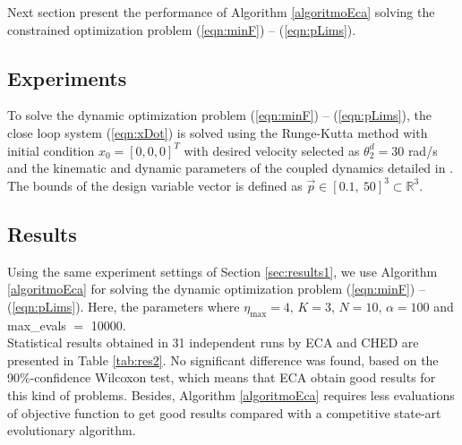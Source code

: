 \documentclass[12pt,letterpape]{article}
\begin{document}
Next section present the performance of Algorithm \ref{algoritmoEca} solving the
constrained optimization problem (\ref{eqn:minF}) -- (\ref{eqn:pLims}).

\subsection{Experiments} %

To solve the dynamic optimization problem (\ref{eqn:minF}) -- (\ref{eqn:pLims}),
the close loop system (\ref{eqn:xDot}) is solved using the Runge-Kutta method
\cite{dormand80} with initial condition $x_0 = [0,0,0]^T$ with desired
velocity selected as $\theta_2^d = 30$ rad/s and the kinematic and dynamic parameters
of the coupled dynamics detailed in \cite{calva13}. The bounds of the design
variable vector is defined as $\vec{p} \in [0.1, \ 50]^3 \subset \mathbb{R}^3 $.\\

\subsection{Results} %
\label{sub:results}

Using the same experiment settings of Section \ref{sec:results1}, we use Algorithm 
\ref{algoritmoEca} for solving the dynamic optimization problem (\ref{eqn:minF}) -- (\ref{eqn:pLims}). Here, the parameters where $\eta_{\max} = 4$, $K = 3$, $N = 10$, $\alpha = 100$ and max\_evals $=$ 10000.\\

Statistical results obtained in 31 independent runs by ECA and CHED are presented in Table \ref{tab:res2}. No significant difference was found, based on the 90\%-confidence Wilcoxon test, which means that ECA obtain good results for this kind of problems. Besides, Algorithm \ref{algoritmoEca} requires
less evaluations of objective function to get good results compared with a competitive state-art evolutionary algorithm.\\


\end{document}
